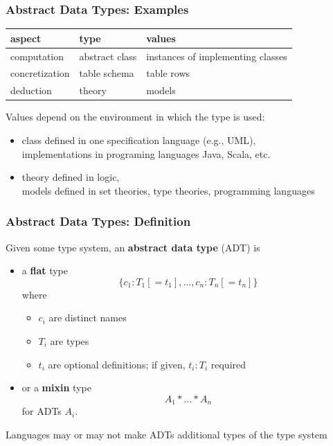 \documentclass{beamer}
\begin{document}
\begin{frame}\frametitle{Abstract Data Types: Examples}
\begin{center}
\begin{tabular}{l|ll}
aspect & type & values \\
\hline
computation & abstract class & instances of implementing classes \\
concretization & table schema & table rows \\
deduction & theory & models
\end{tabular}
\end{center}

Values depend on the environment in which the type is used:
\begin{itemize}
\item class defined in one specification language (e.g., UML), \\
 implementations in programing languages Java, Scala, etc.
\item theory defined in logic,\\
 models defined in set theories, type theories, programming languages
\end{itemize}
\end{frame}

\begin{frame}\frametitle{Abstract Data Types: Definition}
Given some type system, an \textbf{abstract data type} (ADT) is
\begin{itemize}
\item a \textbf{flat} type
  \[\{c_1:T_1[=t_1],\ldots,c_n:T_n[=t_n]\}\]
  where
  \begin{itemize}
  \item $c_i$ are distinct names
  \item $T_i$ are types
  \item $t_i$ are optional definitions; if given, $t_i:T_i$ required
  \end{itemize}
\item or a \textbf{mixin} type
  \[A_1*\ldots*A_n\]
  for ADTs $A_i$.
\end{itemize}

Languages may or may not make ADTs additional types of the type system
\end{frame}
\end{document}
